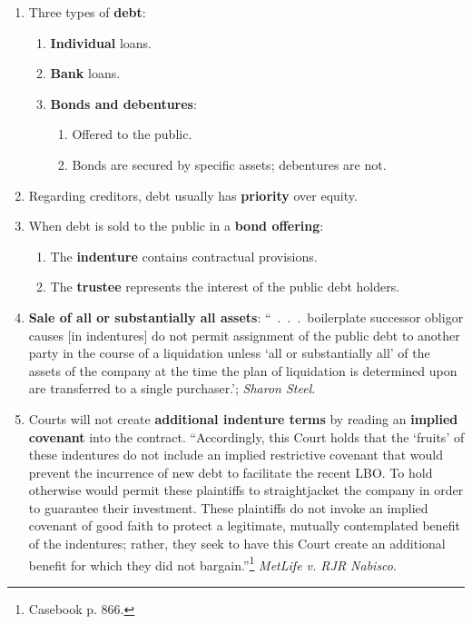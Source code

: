 \begin{enumerate}
    \item Three types of \textbf{debt}:
    \begin{enumerate}
        \item \textbf{Individual} loans.
        \item \textbf{Bank} loans.
        \item \textbf{Bonds and debentures}:
        \begin{enumerate}
            \item Offered to the public.
            \item Bonds are secured by specific assets; debentures are not.
        \end{enumerate}
    \end{enumerate}
    \item Regarding creditors, debt usually has \textbf{priority} over equity.
    \item When debt is sold to the public in a \textbf{bond offering}:
    \begin{enumerate}
        \item The \textbf{indenture} contains contractual provisions.
        \item The \textbf{trustee} represents the interest of the public debt 
        holders.
    \end{enumerate}
    \item \textbf{Sale of all or substantially all assets}: 
    ``~.~.~.~boilerplate successor obligor causes [in indentures] do not 
    permit assignment of the public debt to another party in the course of 
    a liquidation unless `all or substantially all' of the assets of the 
    company at the time the plan of liquidation is determined upon are 
    transferred to a single purchaser.'; \emph{Sharon Steel}.
    \item Courts will not create \textbf{additional indenture terms} by 
    reading an \textbf{implied covenant} into the contract. ``Accordingly, 
    this Court holds that the `fruits' of these indentures do not include an 
    implied restrictive covenant that would prevent the incurrence of new debt 
    to facilitate the recent LBO. To hold otherwise would permit these 
    plaintiffs to straightjacket the company in order to guarantee their 
    investment. These plaintiffs do not invoke an implied covenant of good 
    faith to protect a legitimate, mutually contemplated benefit of the 
    indentures; rather, they seek to have this Court create an additional 
    benefit for which they did not bargain.''\footnote{Casebook p. 866.} 
    \emph{MetLife v. RJR Nabisco}.
\end{enumerate}

